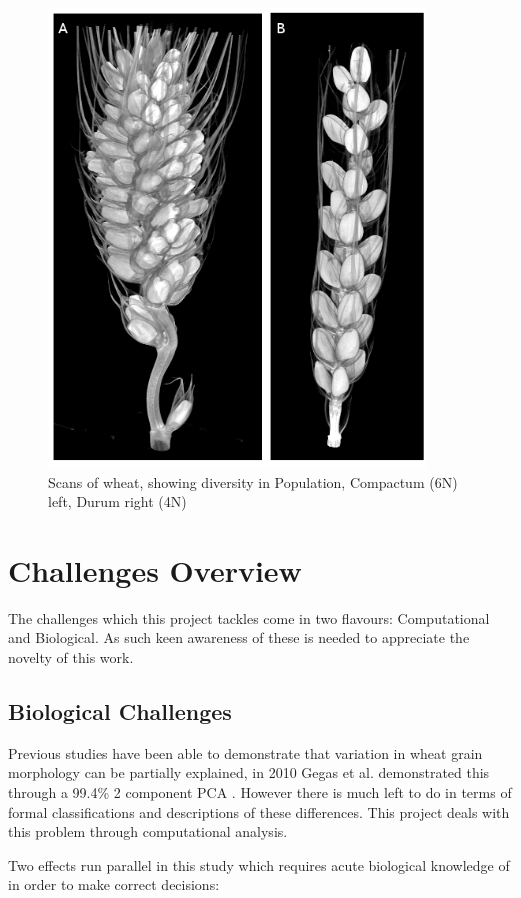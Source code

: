 \documentclass[11pt]{report}
\begin{document}
\begin{figure}[htbp]
\centering
\includegraphics[width=10cm]{./images/spikes.png}
\caption{\label{fig:orgbbe5af6}
Scans of wheat, showing diversity in Population, Compactum (6N) left, Durum right (4N)}
\end{figure}

\section{Challenges Overview}
\label{sec:org1e9c9d7}

The challenges which this project tackles come in two flavours: Computational and Biological. As such keen awareness of these is needed to appreciate the novelty of this work.

\subsection{Biological Challenges}
\label{sec:org6491607}
Previous studies have been able to demonstrate that variation in wheat grain morphology can be partially explained, in 2010 Gegas et al. demonstrated this through a 99.4\% 2 component PCA \cite{Gegas2010}. However there is much left to do in terms of formal classifications and descriptions of these differences. This project deals with this problem through computational analysis.

Two effects run parallel in this study which requires acute biological knowledge of in order to make correct decisions:
\end{document}
